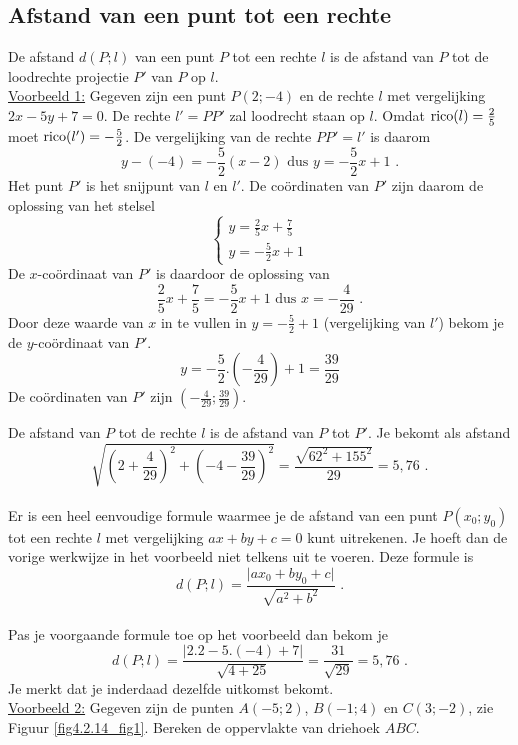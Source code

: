 \subsection{Afstand van een punt tot een rechte}
\noindent

De afstand $d(P;l)$ van een punt $P$ tot een rechte $l$ is de afstand van $P$ tot de loodrechte projectie $P'$ van $P$ op $l$.\\

\noindent \underline{Voorbeeld 1:} Gegeven zijn een punt $P(2;-4)$ en de rechte $l$ met vergelijking $2x-5y+7=0$.
De rechte $l'=PP'$ zal loodrecht staan op $l$.
Omdat $\operatorname{rico} (l)=\frac {2}{5}$ moet $\operatorname{rico} (l')=-\frac {5}{2}$.
De vergelijking van de rechte $PP'=l'$ is daarom
\[
y-(-4)=-\frac {5}{2} (x-2) \text { dus } y=-\frac {5}{2}x+1 \text { .}
\]
Het punt $P'$ is het snijpunt van $l$ en $l'$.
De co\"ordinaten van $P'$ zijn daarom de oplossing van het stelsel
\[
\begin{cases}
y=\frac {2}{5} x +\frac {7}{5} \\
y=-\frac {5}{2} x +1
\end{cases}
\] 
De $x$-co\"ordinaat van $P'$ is daardoor de oplossing van
\[
\frac {2}{5} x+\frac {7}{5} = -\frac {5}{2} x +1 \text { dus } x=-\frac {4}{29} \text { .}
\]
Door deze waarde van $x$ in te vullen in $y=-\frac {5}{2}+1$ (vergelijking van $l'$) bekom je de $y$-co\"ordinaat van $P'$.
\[
y=-\frac {5}{2}.(-\frac{4}{29})+1=\frac {39}{29}
\]
De co\"ordinaten van $P'$ zijn $(-\frac {4}{29}; \frac {39}{29 })$.

De afstand van $P$ tot de rechte $l$ is de afstand van $P$ tot $P'$.
Je bekomt als afstand
\[
\sqrt { \left( 2+\frac {4}{29}  \right)^2 + \left( -4-\frac {39}{29}  \right)^2  } =\frac {\sqrt { 62^2+155^2}}{29}=5,76 \text { .}
\]\\

Er is een heel eenvoudige formule waarmee je de afstand van een punt $P(x_0;y_0)$ tot een rechte $l$ met vergelijking $ax+by+c=0$ kunt uitrekenen.
Je hoeft dan de vorige werkwijze in het voorbeeld niet telkens uit te voeren.
Deze formule is
\[
d(P;l)=\frac { \vert ax_0+by_0+c \vert }{\sqrt {a^2+b^2}} \text { .}
\]\\

Pas je voorgaande formule toe op het voorbeeld dan bekom je
\[
d(P;l)=\frac { \vert 2.2-5.(-4)+7 \vert }{\sqrt {4+25}}=\frac {31}{\sqrt {29}}=5,76 \text { .}
\]
Je merkt dat je inderdaad dezelfde uitkomst bekomt.\\

\noindent \underline{Voorbeeld 2:} Gegeven zijn de punten $A(-5;2)$, $B(-1;4)$ en $C(3;-2)$, zie Figuur \ref{fig4.2.14_fig1}.
Bereken de oppervlakte van driehoek $ABC$.

